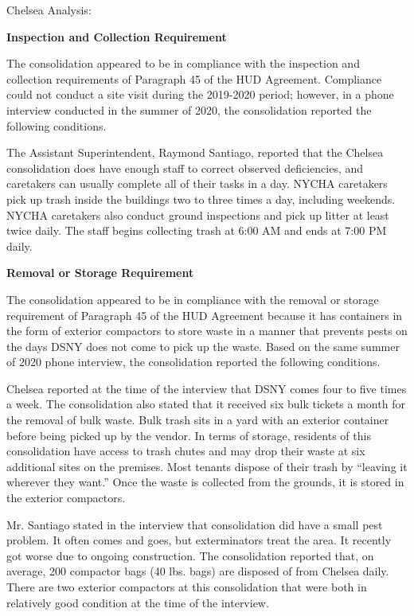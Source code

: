 Chelsea Analysis: 

\textbf{Inspection and Collection Requirement} 

 

The consolidation appeared to be in compliance with the inspection and collection requirements of Paragraph 45 of the HUD Agreement. Compliance could not conduct a site visit during the 2019-2020 period; however, in a phone interview conducted in the summer of 2020, the consolidation reported the following conditions.

The Assistant Superintendent, Raymond Santiago, reported that the Chelsea consolidation does have enough staff to correct observed deficiencies, and caretakers can usually complete all of their tasks in a day. NYCHA caretakers pick up trash inside the buildings two to three times a day, including weekends. NYCHA caretakers also conduct ground inspections and pick up litter at least twice daily. The staff begins collecting trash at 6:00 AM and ends at 7:00 PM daily.

\textbf{Removal or Storage Requirement} 

The consolidation appeared to be in compliance with the removal or storage requirement of Paragraph  45 of the HUD Agreement because it has containers in the form of exterior compactors to store waste in a manner that prevents pests on the days DSNY does not come to pick up the waste. Based on the same summer of  2020  phone interview, the consolidation reported the following conditions.

 

Chelsea reported at the time of the interview that DSNY comes four to five times a week. The consolidation also stated that it received six bulk tickets a month for the removal of bulk waste. Bulk trash sits in a yard with an exterior container before being picked up by the vendor. In terms of storage, residents of this consolidation have access to trash chutes and may drop their waste at six additional sites on the premises. Most tenants dispose of their trash by ``leaving it wherever they want.'' Once the waste is collected from the grounds, it is stored in the exterior compactors.  

 

Mr. Santiago stated in the interview that consolidation did have a small pest problem. It often comes and goes, but exterminators treat the area. It recently got worse due to ongoing construction. The consolidation reported that, on average, 200 compactor bags (40 lbs. bags)  are disposed of from Chelsea daily. There are two exterior compactors at this consolidation that were both in relatively good condition at the time of the interview.

